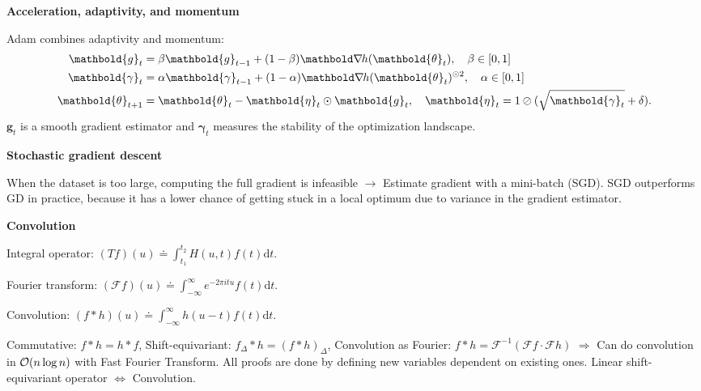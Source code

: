 \documentclass[10pt]{article}
\newenvironment{topic}[1]
{\textbf{\sffamily \footnotesize \colorbox{black}{\rlap{\textbf{\textcolor{white}{#1}}}\hspace{\linewidth}\hspace{-2\fboxsep}}}}
{}
\newenvironment{subtopic}[1]
{\begin{center}\textbf{\footnotesize \sffamily #1}\end{center}}
{}
\renewcommand{\vec}[1]{\ensuremath{\mathbold{#1}}}
\begin{document}
\begin{multicols*}{3}
\begin{topic}{Gradient-based learning}
\begin{subtopic}{Acceleration, adaptivity, and momentum}
            Adam combines adaptivity and momentum:
            \begin{align*}
                \vec{g}_t          & = \beta \vec{g}_{t-1} + (1-\beta) \grad{h(\vec{\theta}_t)}{}, \quad \beta \in [0,1]                               \\
                \vec{\gamma}_t     & = \alpha\vec{\gamma}_{t-1} + (1-\alpha) \grad{h(\vec{\theta}_t)}{}^{\odot 2}, \quad \alpha \in [0,1]              \\
                \vec{\theta}_{t+1} & = \vec{\theta}_t - \vec{\eta}_t \odot \vec{g}_t, \quad \vec{\eta}_t = 1 \oslash (\sqrt{\vec{\gamma}_t} + \delta).
            \end{align*}
            $\vec{g}_t$ is a smooth gradient estimator and $\vec{\gamma}_t$ measures the stability of the optimization landscape.
        \end{subtopic}

        \begin{subtopic}{Stochastic gradient descent}
            When the dataset is too large, computing the full gradient is infeasible $\to$ Estimate
            gradient with a mini-batch (SGD). SGD outperforms GD in practice, because it has a lower
            chance of getting stuck in a local optimum due to variance in the gradient estimator.
        \end{subtopic}

    \end{topic}

    \begin{topic}{Convolutional networks}

        \begin{subtopic}{Convolution}
            Integral operator: $(Tf)(u) \doteq \int_{t_1}^{t_2} H(u,t) f(t) \mathrm{d}t$.

            Fourier transform: $(\mathcal{F}f)(u) \doteq \int_{-\infty}^\infty e^{-2\pi itu} f(t) \mathrm{d}t$.

            Convolution: $(f * h)(u) \doteq \int_{-\infty}^{\infty} h(u-t) f(t) \mathrm{d}t$.

            Commutative: $f * h = h * f$, Shift-equivariant: $f_{\Delta} * h = (f * h)_{\Delta}$, Convolution
            as Fourier: $f * h = \mathcal{F}^{-1}(\mathcal{F}f \cdot \mathcal{F}h)$ $\Rightarrow$ Can
            do convolution in $\bigo{n \log n}$ with Fast Fourier Transform. All proofs are done by
            defining new variables dependent on existing ones. Linear shift-equivariant operator $\iff$
            Convolution.


\end{subtopic}
\end{topic}
\end{multicols*}
\end{document}
